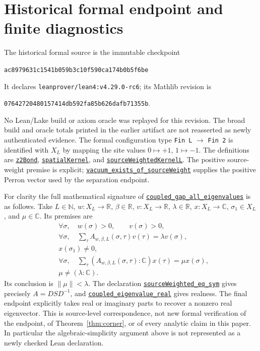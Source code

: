 \documentclass[11pt]{article}
\newcommand{\R}{\mathbb R}\newcommand{\C}{\mathbb C}\newcommand{\N}{\mathbb N}
\newcommand{\hist}{ac8979631c1541b059b3c10f590ca174b0b5f6be}
\newcommand{\decl}[2]{\href{https://github.com/lluiseriksson/THE-ERIKSSON-PROGRAMME/blob/\hist/YangMills/OS/#1.lean}{\nolinkurl{#2}}}
\begin{document}
\section{Historical formal endpoint and finite diagnostics}
The historical formal source is the immutable checkpoint
\begin{center}\small\texttt{\hist}\end{center}
It declares \texttt{leanprover/lean4:v4.29.0-rc6}; its Mathlib revision is
\begin{center}\small\texttt{07642720480157414db592fa85b626dafb71355b}.\end{center}
No Lean/Lake build or axiom oracle was replayed for this revision.
The broad build and oracle totals printed in the earlier artifact are not
reasserted as newly authenticated evidence.
The formal configuration type \texttt{Fin L} $\to$ \texttt{Fin 2} is identified
with $X_L$ by mapping the site values $0\mapsto+1$, $1\mapsto-1$.
The definitions are \decl{Z2Identification}{z2Bond},
\decl{SpatialExtent}{spatialKernel}, and
\decl{PerronKernel}{sourceWeightedKernelL}. The positive source-weight premise
is explicit; \decl{PerronKernel}{vacuum_exists_of_sourceWeight} supplies the
positive Perron vector used by the separation endpoint.

For clarity the full mathematical signature of
\decl{PerronGap}{coupled_gap_all_eigenvalues} is as follows.
Take $L\in\N$, $w:X_L\to\R$, $\beta\in\R$, $v:X_L\to\R$,
$\lambda\in\R$, $x:X_L\to\C$, $\sigma_1\in X_L$, and $\mu\in\C$.
Its premises are
\begin{align*}
 &\forall\sigma,\quad w(\sigma)>0,\qquad v(\sigma)>0,\\
 &\forall\sigma,\quad\sum_\tau A_{w,\beta,L}(\sigma,\tau)v(\tau)
       =\lambda v(\sigma),\\
 &x(\sigma_1)\ne0,\\
 &\forall\sigma,\quad\sum_\tau
       (A_{w,\beta,L}(\sigma,\tau):\C)x(\tau)=\mu x(\sigma),\\
 &\mu\ne(\lambda:\C).
\end{align*}
Its conclusion is $\|\mu\|<\lambda$.
The declaration \decl{PerronGap}{sourceWeighted_eq_sym} gives precisely
$A=DSD^{-1}$, and \decl{PerronGap}{coupled_eigenvalue_real} gives realness.
The final endpoint explicitly takes real or imaginary parts to recover a
nonzero real eigenvector. This is source-level correspondence, not new formal
verification of the endpoint, of Theorem~\ref{thm:corner}, or of every analytic
claim in this paper. In particular the algebraic-simplicity argument above is
not represented as a newly checked Lean declaration.
\end{document}
